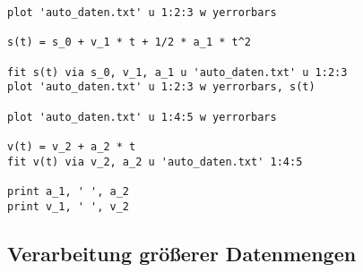 \begin{lstlisting}
plot 'auto_daten.txt' u 1:2:3 w yerrorbars

s(t) = s_0 + v_1 * t + 1/2 * a_1 * t^2

fit s(t) via s_0, v_1, a_1 u 'auto_daten.txt' u 1:2:3
plot 'auto_daten.txt' u 1:2:3 w yerrorbars, s(t)

plot 'auto_daten.txt' u 1:4:5 w yerrorbars

v(t) = v_2 + a_2 * t
fit v(t) via v_2, a_2 u 'auto_daten.txt' 1:4:5

print a_1, ' ', a_2
print v_1, ' ', v_2
\end{lstlisting}

\subsection{Verarbeitung größerer Datenmengen}

